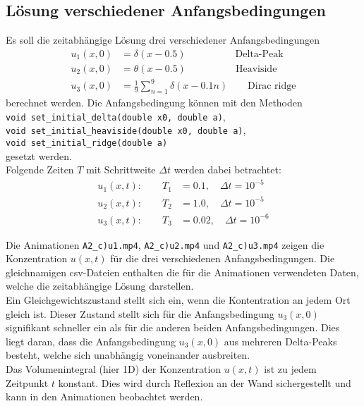 \subsection{Lösung verschiedener Anfangsbedingungen}
Es soll die zeitabhängige Lösung drei verschiedener Anfangsbedingungen
\begin{align}
    u_1(x,0) &= \delta(x-0.5) \qquad \qquad \quad \text{Delta-Peak}\\
    u_2(x,0) &= \theta(x-0.5) \qquad \qquad \quad \text{Heaviside}\\
    u_3(x,0) &= \frac{1}{9} \sum_{n=1}^{9} \delta(x-0.1n) \qquad \text{Dirac ridge}
\end{align}
berechnet werden.
Die Anfangsbedingung können mit den Methoden \\
\texttt{void set\_initial\_delta(double x0, double a)}, \\
\texttt{void set\_initial\_heaviside(double x0, double a)}, \\
\texttt{void set\_initial\_ridge(double a)} \\
gesetzt werden.
\\
Folgende Zeiten $T$ mit Schrittweite $\Delta t$ werden dabei betrachtet:
\begin{align*}
    u_1(x,t): \qquad T_1 &= 0.1, \quad \Delta t = 10^{-5}\\
    u_2(x,t): \qquad T_2 &= 1.0, \quad \Delta t = 10^{-5}\\
    u_3(x,t): \qquad T_3 &= 0.02, \quad \Delta t = 10^{-6}
\end{align*}

Die Animationen \texttt{A2\_c)u1.mp4}, \texttt{A2\_c)u2.mp4} und \texttt{A2\_c)u3.mp4} zeigen die Konzentration $u(x,t)$ für die drei verschiedenen Anfangsbedingungen.
Die gleichnamigen csv-Dateien enthalten die für die Animationen verwendeten Daten, welche die zeitabhängige Lösung darstellen.
\\
Ein Gleichgewichtszustand stellt sich ein, wenn die Kontentration an jedem Ort gleich ist.
Dieser Zustand stellt sich für die Anfangsbedingung $u_3(x,0)$ signifikant schneller ein als für die anderen beiden Anfangsbedingungen.
Dies liegt daran, dass die Anfangsbedingung $u_3(x,0)$ aus mehreren Delta-Peaks besteht, welche sich unabhängig voneinander ausbreiten.
\\
Das Volumenintegral (hier 1D) der Konzentration $u(x,t)$ ist zu jedem Zeitpunkt $t$ konstant.
Dies wird durch Reflexion an der Wand sichergestellt und kann in den Animationen beobachtet werden.